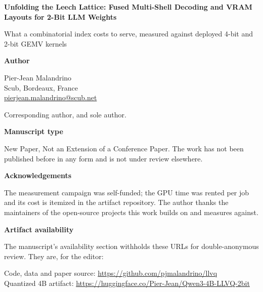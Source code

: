 \documentclass[11pt,a4paper]{article}
\begin{document}
{\Large\bfseries Unfolding the Leech Lattice: Fused Multi-Shell Decoding and
VRAM Layouts for 2-Bit LLM Weights\par}

\vspace{0.4em}
{\large What a combinatorial index costs to serve, measured against deployed
4-bit and 2-bit GEMV kernels\par}

\vspace{2em}
{\bfseries Author}

\vspace{0.5em}
Pier-Jean Malandrino\\
Scub, Bordeaux, France\\
\href{mailto:pierjean.malandrino@scub.net}{pierjean.malandrino@scub.net}

\vspace{0.5em}
Corresponding author, and sole author.

\vspace{2em}
{\bfseries Manuscript type}

\vspace{0.5em}
New Paper, Not an Extension of a Conference Paper. The work has not been
published before in any form and is not under review elsewhere.

\vspace{2em}
{\bfseries Acknowledgements}

\vspace{0.5em}
The measurement campaign was self-funded; the GPU time was rented per job and
its cost is itemized in the artifact repository. The author thanks the
maintainers of the open-source projects this work builds on and measures
against.

\vspace{2em}
{\bfseries Artifact availability}

\vspace{0.5em}
The manuscript's availability section withholds these URLs for
double-anonymous review. They are, for the editor:

\vspace{0.4em}
Code, data and paper source: \url{https://github.com/pjmalandrino/llvq}\\
Quantized 4B artifact: \url{https://huggingface.co/Pier-Jean/Qwen3-4B-LLVQ-2bit}
\end{document}
